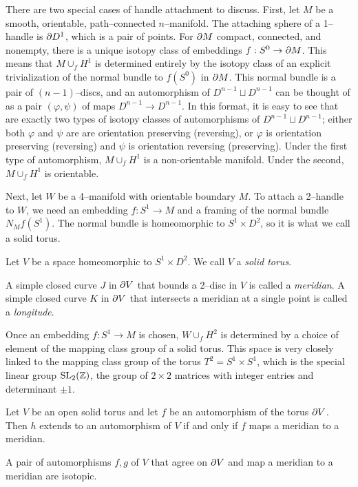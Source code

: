 There are two special cases of handle attachment to discuss.
First, let $M$ be a smooth, orientable, path--connected $n$--manifold.
The attaching sphere of a 1--handle is $\partial D^1$, which is a pair of points.
For $\partial M$ compact, connected, and nonempty, there is a unique isotopy class of embeddings $f:S^0\to\partial M$.
This means that $M\cup_f H^1$ is determined entirely by the isotopy class of an explicit trivialization of the normal bundle to $f(S^0)$ in $\partial M$.
This normal bundle is a pair of $(n-1)$--discs, and an automorphism of $D^{n-1}\sqcup D^{n-1}$ can be thought of as a pair $(\varphi,\psi)$ of maps $D^{n-1}\to D^{n-1}$.
In this format, it is easy to see that are exactly two types of isotopy classes of automorphisms of $D^{n-1}\sqcup D^{n-1}$; either both $\varphi$ and $\psi$ are are orientation preserving (reversing), or $\varphi$ is orientation preserving (reversing) and $\psi$ is orientation reversing (preserving).
Under the first type of automorphism, $M\cup_f H^1$ is a non-orientable manifold.
Under the second, $M\cup_f H^1$ is orientable.

Next, let $W$ be a 4--manifold with orientable boundary $M$.
To attach a 2--handle to $W$, we need an embedding $f:S^1\to M$ and a framing of the normal bundle $N_M f(S^1)$.
The normal bundle is homeomorphic to $S^1\times D^2$, so it is what we call a solid torus.

\begin{defn}
	Let $V$ be a space homeomorphic to $S^1\times D^2$.
	We call $V$ a \emph{solid torus}.
	
	A simple closed curve $J$ in $\partial V$ that bounds a 2--disc in $V$ is called a \emph{meridian}.
	A simple closed curve $K$ in $\partial V$ that intersects a meridian at a single point is called a \emph{longitude}.
\end{defn}

Once an embedding $f:S^1\to M$ is chosen, $W\cup_f H^2$ is determined by a choice of element of the mapping class group of a solid torus.
This space is very closely linked to the mapping class group of the torus $T^2 = S^1\times S^1$, which is the special linear group $\textrm{SL}_2(\mathbb{Z})$, the group of $2\times 2$ matrices with integer entries and determinant $\pm 1$.
\begin{lem}
	Let $V$ be an open solid torus and let $f$ be an automorphism of the torus $\partial V$.
	Then $h$ extends to an automorphism of $V$ if and only if $f$ maps a meridian to a meridian.	
\end{lem}

\begin{lem}
	A pair of automorphisms $f,g$ of $V$ that agree on $\partial V$ and map a meridian to a meridian are isotopic.	
\end{lem}

